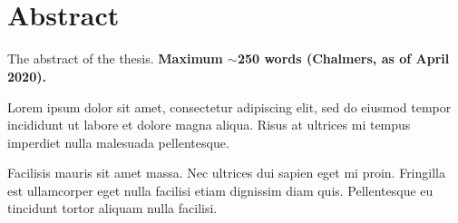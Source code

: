 \begin{raggedright}
\noindent 
{\large\textbf{\mytitle}}\\
\ifx\mysubtitle\undefined\else\textit{\small\mysubtitle}\fi
\end{raggedright}

\vskip 1mm
\noindent
{\sc\authorname}
\vskip 1mm
\noindent
\textit{\mydepartment}\\
\textit{\chalIgu}

\vskip 8mm

\section*{Abstract}

\noindent
The abstract of the thesis. %
%
\textbf{Maximum $\sim$250 words (Chalmers, as of April 2020).}

Lorem ipsum dolor sit amet, consectetur adipiscing elit, sed do eiusmod tempor incididunt ut labore et dolore magna aliqua. Risus at ultrices mi tempus imperdiet nulla malesuada pellentesque.

Facilisis mauris sit amet massa. Nec ultrices dui sapien eget mi proin. Fringilla est ullamcorper eget nulla facilisi etiam dignissim diam quis. Pellentesque eu tincidunt tortor aliquam nulla facilisi.


\vspace{10 mm}

\vspace{3 mm}

